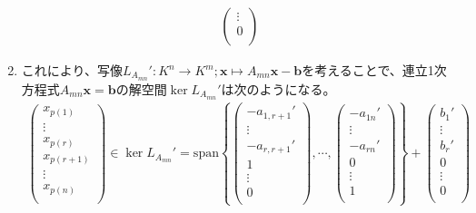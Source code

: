 \documentclass[dvipdfmx]{jsarticle}
\begin{document}
\begin{thm}
\begin{enumerate}
\begin{align*}
\begin{pmatrix}
 \vdots \\
0 \\
\end{pmatrix}\end{align*}
\item
  これにより、写像$L_{A_{mn}}':K^{n} \rightarrow K^{m};\mathbf{x} \mapsto A_{mn}\mathbf{x} - \mathbf{b}$を考えることで、連立1次方程式$A_{mn}\mathbf{x} = \mathbf{b}$の解空間$\ker L_{A_{mn}}'$は次のようになる。
\begin{align*}
\begin{pmatrix}
x_{p(1)} \\
 \vdots \\
x_{p(r)} \\
x_{p(r + 1)} \\
 \vdots \\
x_{p(n)} \\
\end{pmatrix} \in \ker L_{A_{mn}}' = {\mathrm{span} }\left\{ \begin{pmatrix}
 - a_{1,r + 1}' \\
 \vdots \\
 - a_{r,r + 1}' \\
1 \\
 \vdots \\
0 \\
\end{pmatrix},\cdots,\begin{pmatrix}
 - a_{1n}' \\
 \vdots \\
 - a_{rn}' \\
0 \\
 \vdots \\
1 \\
\end{pmatrix} \right\} + \begin{pmatrix}
b_{1}' \\
 \vdots \\
b_{r}' \\
0 \\
 \vdots \\
0 \\
\end{pmatrix}
\end{align*}
\end{enumerate}
\end{thm}\par
\end{document}
